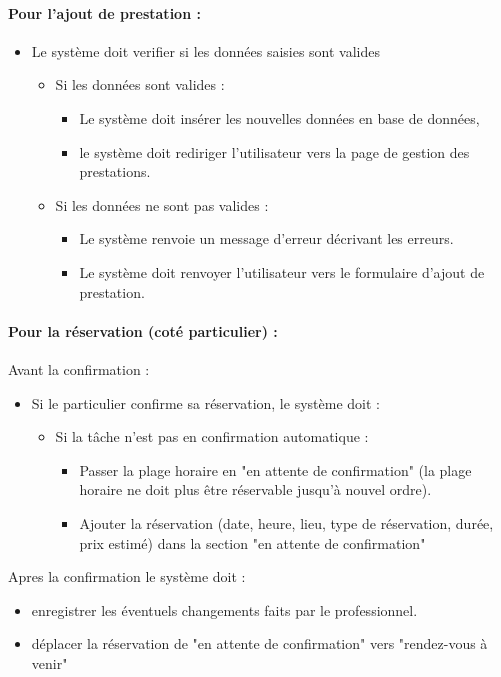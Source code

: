 \documentclass{article}
\begin{document}
\paragraph{Pour l'ajout de prestation :}
\begin{itemize}
\item Le système doit verifier si les données saisies sont valides
	\begin{itemize}
	\item Si les données sont valides :
		\begin{itemize}
		\item Le système doit insérer les nouvelles données en base
                  de données,
                 \item le système doit rediriger l'utilisateur vers
                    la page de gestion des prestations.
		\end{itemize}
		\item Si les données ne sont pas valides :
		\begin{itemize}
		\item Le système renvoie un message d'erreur décrivant
                  les erreurs.
                \item Le système doit renvoyer l'utilisateur vers le
                  formulaire d'ajout de prestation.
		\end{itemize}
	\end{itemize}
\end{itemize}


\paragraph{Pour la réservation (coté particulier) :}
Avant la confirmation :
	\begin{itemize}
	\item Si le particulier confirme sa réservation, le système doit :
	\begin{itemize}
	\item Si la tâche n'est pas en confirmation automatique :
		\begin{itemize}
		\item Passer la plage horaire en "en attente de confirmation"
			(la plage horaire ne doit plus être réservable jusqu'à nouvel ordre).
		\item Ajouter la réservation (date, heure, lieu, type de réservation, durée, prix estimé) dans la section "en attente de confirmation"
		\end{itemize}
		\end{itemize}
	\end{itemize}
Apres la confirmation le système doit :
		\begin{itemize}
		\item enregistrer les éventuels changements faits par le professionnel.
		\item déplacer la réservation de "en attente de confirmation" vers "rendez-vous à venir"
		\end{itemize}
\end{document}
